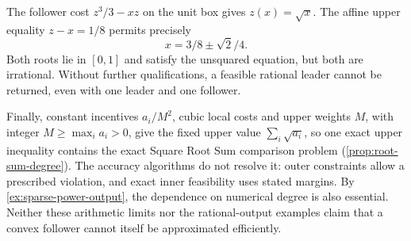 \begin{example}
\label{ex:accuracy-irrational-feasibility}
The follower cost $z^3/3-xz$ on the unit box gives $z(x)=\sqrt x$.
The affine upper equality $z-x=1/8$ permits precisely
\[
                         x=3/8\pm\sqrt2/4.
\]
Both roots lie in $[0,1]$ and satisfy the unsquared equation, but both
are irrational. Without further qualifications, a feasible rational
leader cannot be returned, even with one leader and one follower.
\end{example}

Finally, constant incentives $a_i/M^2$, cubic local costs and upper
weights $M$, with integer $M\ge\max_i a_i>0$, give the fixed upper
value $\sum_i\sqrt{a_i}$, so one exact upper inequality contains the exact
Square Root Sum comparison problem (\cref{prop:root-sum-degree}). The
accuracy algorithms do not resolve it: outer constraints allow a
prescribed violation, and exact inner feasibility uses stated margins.
By \cref{ex:sparse-power-output}, the dependence on numerical degree is
also essential. Neither these arithmetic limits nor the rational-output
examples claim that a convex follower cannot itself be approximated
efficiently.
